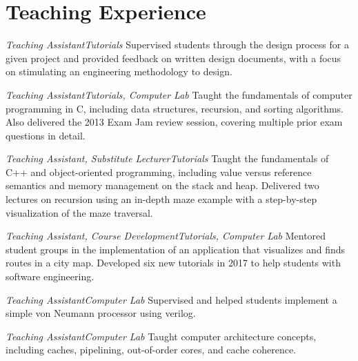 \section{\sc Teaching Experience}

{\textit{Teaching Assistant}}{\textit{Tutorials}}
{
  Supervised students through the design process for a given project and provided feedback on written design documents, with a focus on stimulating an engineering methodology to design.
}

{\textit{Teaching Assistant}}{\textit{Tutorials, Computer Lab}}
{
  Taught the fundamentals of computer programming in C, including data structures, recursion, and sorting algorithms.
  Also delivered the 2013 Exam Jam review session, covering multiple prior exam questions in detail.
}

{\textit{Teaching Assistant, Substitute Lecturer}}{\textit{Tutorials}}
{
  Taught the fundamentals of C++ and object-oriented programming, including value versus reference semantics and memory management on the stack and heap.
  Delivered two lectures on recursion using an in-depth maze example with a step-by-step visualization of the maze traversal.
}

{\textit{Teaching Assistant, Course Development}}{\textit{Tutorials, Computer Lab}}
{
  Mentored student groups in the implementation of an application that visualizes and finds routes in a city map.
  Developed six new tutorials in 2017 to help students with software engineering.
}

{\textit{Teaching Assistant}}{\textit{Computer Lab}}
{
  Supervised and helped students implement a simple von Neumann processor using verilog.
}

{\textit{Teaching Assistant}}{\textit{Computer Lab}}
{
  Taught computer architecture concepts, including caches, pipelining, out-of-order cores, and cache coherence.
}
